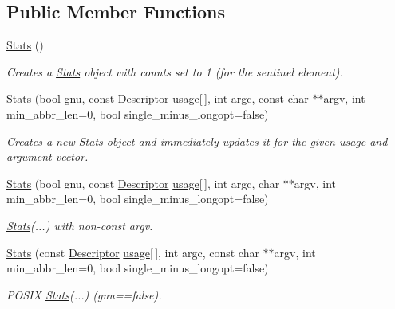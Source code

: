 \subsection*{Public Member Functions}
\begin{DoxyCompactItemize}
\item 
\hyperlink{struct_option_parser_1_1_stats_af488528dadc4a10c77a0135b1205e23d}{Stats} ()
\begin{DoxyCompactList}\small\item\em Creates a \hyperlink{struct_option_parser_1_1_stats}{Stats} object with counts set to 1 (for the sentinel element). \end{DoxyCompactList}\item 
\hyperlink{struct_option_parser_1_1_stats_adb41f21c1a7c4f494f5831d9b8585b8a}{Stats} (bool gnu, const \hyperlink{struct_option_parser_1_1_descriptor}{Descriptor} \hyperlink{_community_detection_8cpp_ae4e685e845abde182eb8fc1f87b756ae}{usage}\mbox{[}$\,$\mbox{]}, int argc, const char $\ast$$\ast$argv, int min\-\_\-abbr\-\_\-len=0, bool single\-\_\-minus\-\_\-longopt=false)
\begin{DoxyCompactList}\small\item\em Creates a new \hyperlink{struct_option_parser_1_1_stats}{Stats} object and immediately updates it for the given {\ttfamily usage} and argument vector. \end{DoxyCompactList}\item 
\hyperlink{struct_option_parser_1_1_stats_a75907970e80d82ec01a8db827012b7af}{Stats} (bool gnu, const \hyperlink{struct_option_parser_1_1_descriptor}{Descriptor} \hyperlink{_community_detection_8cpp_ae4e685e845abde182eb8fc1f87b756ae}{usage}\mbox{[}$\,$\mbox{]}, int argc, char $\ast$$\ast$argv, int min\-\_\-abbr\-\_\-len=0, bool single\-\_\-minus\-\_\-longopt=false)
\begin{DoxyCompactList}\small\item\em \hyperlink{struct_option_parser_1_1_stats}{Stats}(...) with non-\/const argv. \end{DoxyCompactList}\item 
\hyperlink{struct_option_parser_1_1_stats_aed8e2b1777ff408c30b91051fcdd8cfc}{Stats} (const \hyperlink{struct_option_parser_1_1_descriptor}{Descriptor} \hyperlink{_community_detection_8cpp_ae4e685e845abde182eb8fc1f87b756ae}{usage}\mbox{[}$\,$\mbox{]}, int argc, const char $\ast$$\ast$argv, int min\-\_\-abbr\-\_\-len=0, bool single\-\_\-minus\-\_\-longopt=false)
\begin{DoxyCompactList}\small\item\em P\-O\-S\-I\-X \hyperlink{struct_option_parser_1_1_stats}{Stats}(...) (gnu==false). \end{DoxyCompactList}\item 
$$
\end{DoxyCompactItemize}
